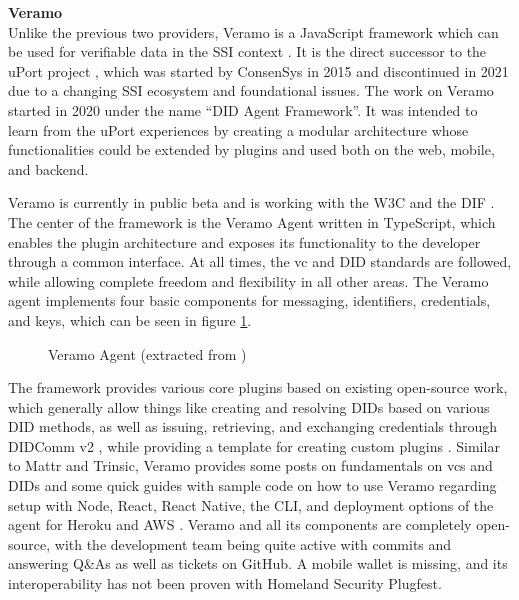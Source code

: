     \textbf{Veramo}\\
    Unlike the previous two providers, Veramo is a JavaScript framework which can be used for verifiable data in the \ac{SSI} context \cite{veramo_veramo_2021-1}. It is the direct successor to the uPort project \cite{uport_uport_2021}, which was started by ConsenSys in 2015 and discontinued in 2021 due to a changing \ac{SSI} ecosystem and foundational issues. The work on Veramo started in 2020 under the name “\ac{DID} Agent Framework”. It was intended to learn from the uPort experiences by creating a modular architecture whose functionalities could be extended by plugins and used both on the web, mobile, and backend. \cite{uport_veramo_2021}
    
    Veramo is currently in public beta and is working with the \ac{W3C} and the \ac{DIF} \cite{veramo_veramo_2021-1}. The center of the framework is the Veramo Agent written in TypeScript, which enables the plugin architecture and exposes its functionality to the developer through a common interface. At all times, the \ac{vc} and \ac{DID} standards are followed, while allowing complete freedom and flexibility in all other areas. The Veramo agent implements four basic components for messaging, identifiers, credentials, and keys, which can be seen in figure \ref{figure: veramo agent}. \cite{veramo_veramo_2021-2}
    
    \begin{figure}[ht]
	    \centering    	    \makebox[\textwidth]{}
        \caption[Veramo Agent]{Veramo Agent (extracted from \cite{veramo_veramo_2021-2})}
        \label{figure: veramo agent}
    \end{figure}
    
    The framework provides various core plugins based on existing open-source work, which generally allow things like creating and resolving \acp{DID} based on various \ac{DID} methods, as well as issuing, retrieving, and exchanging credentials through DIDComm v2 \cite{veramo_veramo_2021-2, veramo_blog_2021}, while providing a template for creating custom plugins \cite{veramo_uport-projectveramo-plugin_2021}. Similar to Mattr and Trinsic, Veramo provides some posts on fundamentals on \acp{vc} and \acp{DID} and some quick guides with sample code on how to use Veramo regarding setup with Node, React, React Native, the \ac{CLI}, and deployment options of the agent for Heroku and AWS \cite{veramo_veramo_2021-2}. Veramo and all its components are completely open-source, with the development team being quite active with commits and answering Q\&As as well as tickets on GitHub. A mobile wallet is missing, and its interoperability has not been proven \cite{homeland_security_interoperability_2021} with Homeland Security Plugfest.
    
